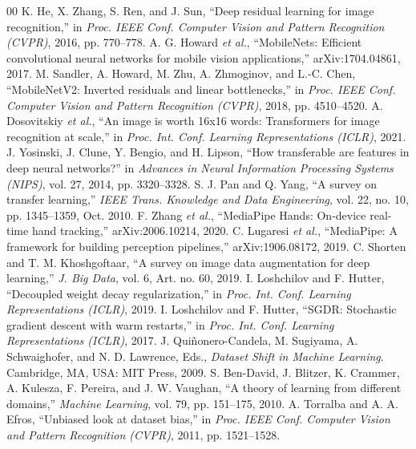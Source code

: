 \documentclass[conference]{IEEEtran}
\begin{document}
\begin{thebibliography}{00}
 K. He, X. Zhang, S. Ren, and J. Sun, ``Deep residual learning for image recognition,'' in \emph{Proc. IEEE Conf. Computer Vision and Pattern Recognition (CVPR)}, 2016, pp. 770--778.
 A. G. Howard \emph{et al.}, ``MobileNets: Efficient convolutional neural networks for mobile vision applications,'' arXiv:1704.04861, 2017.
 M. Sandler, A. Howard, M. Zhu, A. Zhmoginov, and L.-C. Chen, ``MobileNetV2: Inverted residuals and linear bottlenecks,'' in \emph{Proc. IEEE Conf. Computer Vision and Pattern Recognition (CVPR)}, 2018, pp. 4510--4520.
 A. Dosovitskiy \emph{et al.}, ``An image is worth 16x16 words: Transformers for image recognition at scale,'' in \emph{Proc. Int. Conf. Learning Representations (ICLR)}, 2021.
 J. Yosinski, J. Clune, Y. Bengio, and H. Lipson, ``How transferable are features in deep neural networks?'' in \emph{Advances in Neural Information Processing Systems (NIPS)}, vol. 27, 2014, pp. 3320--3328.
 S. J. Pan and Q. Yang, ``A survey on transfer learning,'' \emph{IEEE Trans. Knowledge and Data Engineering}, vol. 22, no. 10, pp. 1345--1359, Oct. 2010.
 F. Zhang \emph{et al.}, ``MediaPipe Hands: On-device real-time hand tracking,'' arXiv:2006.10214, 2020.
 C. Lugaresi \emph{et al.}, ``MediaPipe: A framework for building perception pipelines,'' arXiv:1906.08172, 2019.
 C. Shorten and T. M. Khoshgoftaar, ``A survey on image data augmentation for deep learning,'' \emph{J. Big Data}, vol. 6, Art. no. 60, 2019.
 I. Loshchilov and F. Hutter, ``Decoupled weight decay regularization,'' in \emph{Proc. Int. Conf. Learning Representations (ICLR)}, 2019.
 I. Loshchilov and F. Hutter, ``SGDR: Stochastic gradient descent with warm restarts,'' in \emph{Proc. Int. Conf. Learning Representations (ICLR)}, 2017.
 J. Qui{\~n}onero-Candela, M. Sugiyama, A. Schwaighofer, and N. D. Lawrence, Eds., \emph{Dataset Shift in Machine Learning}. Cambridge, MA, USA: MIT Press, 2009.
 S. Ben-David, J. Blitzer, K. Crammer, A. Kulesza, F. Pereira, and J. W. Vaughan, ``A theory of learning from different domains,'' \emph{Machine Learning}, vol. 79, pp. 151--175, 2010.
 A. Torralba and A. A. Efros, ``Unbiased look at dataset bias,'' in \emph{Proc. IEEE Conf. Computer Vision and Pattern Recognition (CVPR)}, 2011, pp. 1521--1528.
\end{thebibliography}
\end{document}
